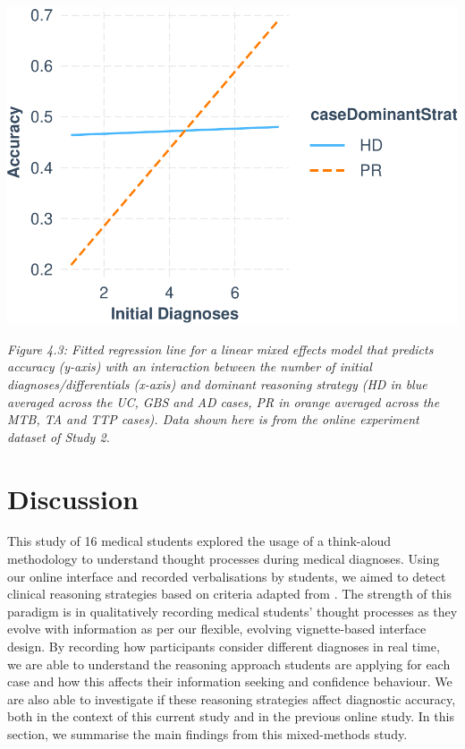 \documentclass[a4paper, nobind]{templates/ociamthesis}
\begin{document}
\hfill\break

\includegraphics{_main_files/figure-latex/accmodelplot-1.pdf}

\emph{Figure 4.3: Fitted regression line for a linear mixed effects model that predicts accuracy (y-axis) with an interaction between the number of initial diagnoses/differentials (x-axis) and dominant reasoning strategy (HD in blue averaged across the UC, GBS and AD cases, PR in orange averaged across the MTB, TA and TTP cases). Data shown here is from the online experiment dataset of Study 2.}

\section*{Discussion}\label{discussion-2}

This study of 16 medical students explored the usage of a think-aloud methodology to understand thought processes during medical diagnoses. Using our online interface and recorded verbalisations by students, we aimed to detect clinical reasoning strategies based on criteria adapted from \autocite{coderre_diagnostic_2003}. The strength of this paradigm is in qualitatively recording medical students' thought processes as they evolve with information as per our flexible, evolving vignette-based interface design. By recording how participants consider different diagnoses in real time, we are able to understand the reasoning approach students are applying for each case and how this affects their information seeking and confidence behaviour. We are also able to investigate if these reasoning strategies affect diagnostic accuracy, both in the context of this current study and in the previous online study. In this section, we summarise the main findings from this mixed-methods study.
\end{document}
